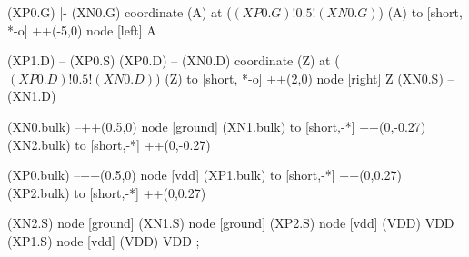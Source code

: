\begin{circuitikz}[american]
	(XP0.G) |- (XN0.G)
	coordinate (A) at ($(XP0.G)!0.5!(XN0.G)$)
	(A) to [short, *-o] ++(-5,0) node [left] {A}
	
	(XP1.D) -- (XP0.S)
	(XP0.D) -- (XN0.D)
	coordinate (Z) at ($(XP0.D)!0.5!(XN0.D)$)
	(Z) to [short, *-o] ++(2,0) node [right] {Z}
	(XN0.S) -- (XN1.D)
	
	(XN0.bulk) --++(0.5,0) node [ground]{}	
	(XN1.bulk) to [short,-*] ++(0,-0.27)
	(XN2.bulk) to [short,-*] ++(0,-0.27)

	(XP0.bulk) --++(0.5,0) node [vdd]{}
	(XP1.bulk) to [short,-*] ++(0,0.27)		
	(XP2.bulk) to [short,-*] ++(0,0.27)		


	(XN2.S) node [ground] {}
	(XN1.S) node [ground] {}
	(XP2.S) node [vdd] (VDD) {VDD}
	(XP1.S) node [vdd] (VDD) {VDD}
;

\end{circuitikz}
